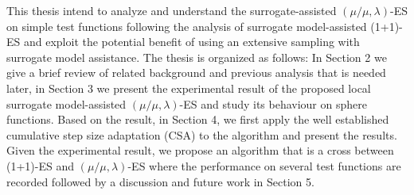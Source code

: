 



This thesis intend to analyze and understand the surrogate-assisted $(\mu/\mu,\lambda)$-ES on simple test functions following the analysis of surrogate model-assisted (1+1)-ES \cite{DBLP:conf/ppsn/KayhaniA18} and exploit the potential benefit of using an extensive sampling with surrogate model assistance. The thesis is organized as follows: In Section 2 we give a brief review of related background and previous analysis that is needed later, in Section 3 we present the experimental result of the proposed local surrogate model-assisted $(\mu/\mu,\lambda)$-ES and study its behaviour on sphere functions. Based on the result, in Section 4, we first apply the well established cumulative step size adaptation (CSA) to the algorithm and present the results. Given the experimental result, we propose an algorithm that is a cross between (1+1)-ES and $(\mu/\mu,\lambda)$-ES where the performance on several test functions are recorded followed by a discussion and future work in Section 5. 











